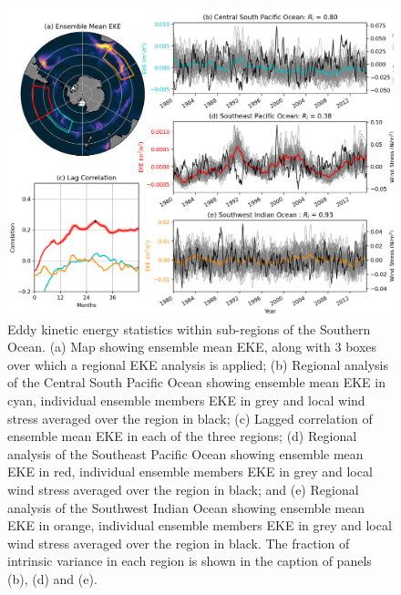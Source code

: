 \documentclass[linenumbers]{agujournal2019}
\begin{document}
\begin{figure}[t]
\begin{center}
\includegraphics[width=\hsize]{Figure4}
\caption{Eddy kinetic energy statistics within sub-regions of the Southern Ocean. (a) Map showing ensemble mean EKE, along with 3 boxes over which a regional EKE analysis is applied; (b) Regional analysis of the Central South Pacific Ocean showing ensemble mean EKE in cyan, individual ensemble members EKE in grey and local wind stress averaged over the region in black; (c) Lagged correlation of ensemble mean EKE in each of the three regions; (d) Regional analysis of the Southeast Pacific Ocean showing ensemble mean EKE in red, individual ensemble members EKE in grey and local wind stress averaged over the region in black; and (e) Regional analysis of the Southwest Indian  Ocean showing ensemble mean EKE in orange, individual ensemble members EKE in grey and local wind stress averaged over the region in black. The fraction of intrinsic variance in each region is shown in the caption of panels (b), (d) and (e).}
\label{Fig:4}
\end{center}
\end{figure}
\end{document}
